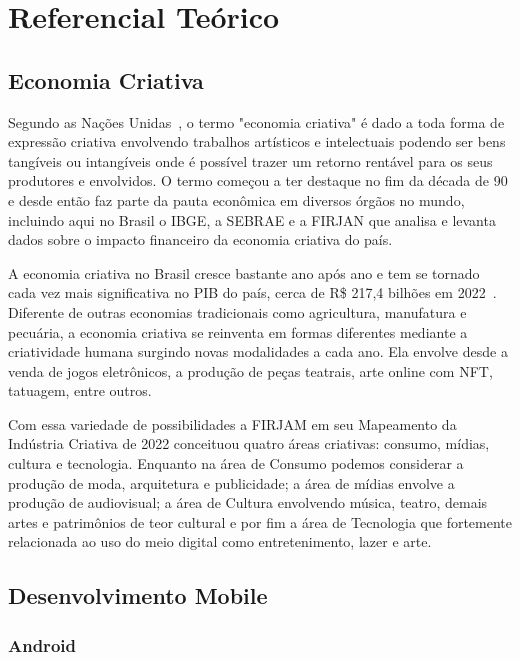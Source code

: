 \chapter{Referencial Teórico}\label{ch:referencial-teorico}

\section{Economia Criativa}\label{sec:economia-criativa}

Segundo as Nações Unidas~\cite{sebrae}, o termo "economia criativa" é dado a toda forma de expressão criativa envolvendo trabalhos artísticos e intelectuais podendo ser bens tangíveis ou intangíveis onde é possível trazer um retorno rentável para os seus produtores e envolvidos.
O termo começou a ter destaque no fim da década de 90 e desde então faz parte da pauta econômica em diversos órgãos no mundo, incluindo aqui no Brasil o IBGE, a  SEBRAE e a FIRJAN que analisa e levanta dados sobre o impacto financeiro da economia criativa do país.

A economia criativa no Brasil cresce bastante ano após ano e tem se tornado cada vez mais significativa no PIB do país, cerca de R\$ 217,4 bilhões em 2022~\cite{firjam}.
Diferente de outras economias tradicionais como agricultura, manufatura e pecuária, a economia criativa se reinventa em formas diferentes mediante a criatividade humana surgindo novas modalidades a cada ano.
Ela envolve desde a venda de jogos eletrônicos, a produção de peças teatrais, arte online com NFT, tatuagem, entre outros.

Com essa variedade de possibilidades a FIRJAM em seu Mapeamento da Indústria Criativa de 2022 conceituou quatro áreas criativas: consumo, mídias, cultura e tecnologia.
Enquanto na área de Consumo podemos considerar a produção de moda, arquitetura e publicidade; a área de mídias envolve a produção de audiovisual; a área de Cultura envolvendo música, teatro, demais artes e patrimônios de teor cultural e por fim a área de Tecnologia que fortemente relacionada ao uso do meio digital como entretenimento, lazer e arte.

\section{Desenvolvimento Mobile}\label{sec:desenvolvimento-mobile}

\subsection{Android}\label{subsec:android}

